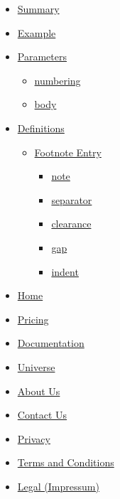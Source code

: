 \begin{itemize}
\tightlist
\item
  \hyperref[summary]{Summary}
\item
  \hyperref[example]{Example}
\item
  \hyperref[parameters]{Parameters}

  \begin{itemize}
  \tightlist
  \item
    \hyperref[parameters-numbering]{numbering}
  \item
    \hyperref[parameters-body]{body}
  \end{itemize}
\item
  \hyperref[definitions]{Definitions}

  \begin{itemize}
  \tightlist
  \item
    \hyperref[definitions-entry]{Footnote Entry}

    \begin{itemize}
    \tightlist
    \item
      \hyperref[definitions-entry-note]{note}
    \item
      \hyperref[definitions-entry-separator]{separator}
    \item
      \hyperref[definitions-entry-clearance]{clearance}
    \item
      \hyperref[definitions-entry-gap]{gap}
    \item
      \hyperref[definitions-entry-indent]{indent}
    \end{itemize}
  \end{itemize}
\end{itemize}

\begin{itemize}
\tightlist
\item
  \href{/}{Home}
\item
  \href{/pricing/}{Pricing}
\item
  \href{/docs/}{Documentation}
\item
  \href{/universe/}{Universe}
\item
  \href{/about/}{About Us}
\item
  \href{/contact/}{Contact Us}
\item
  \href{/privacy/}{Privacy}
\item
  \href{https://typst.app/terms}{Terms and Conditions}
\item
  \href{/legal/}{Legal (Impressum)}
\end{itemize}

